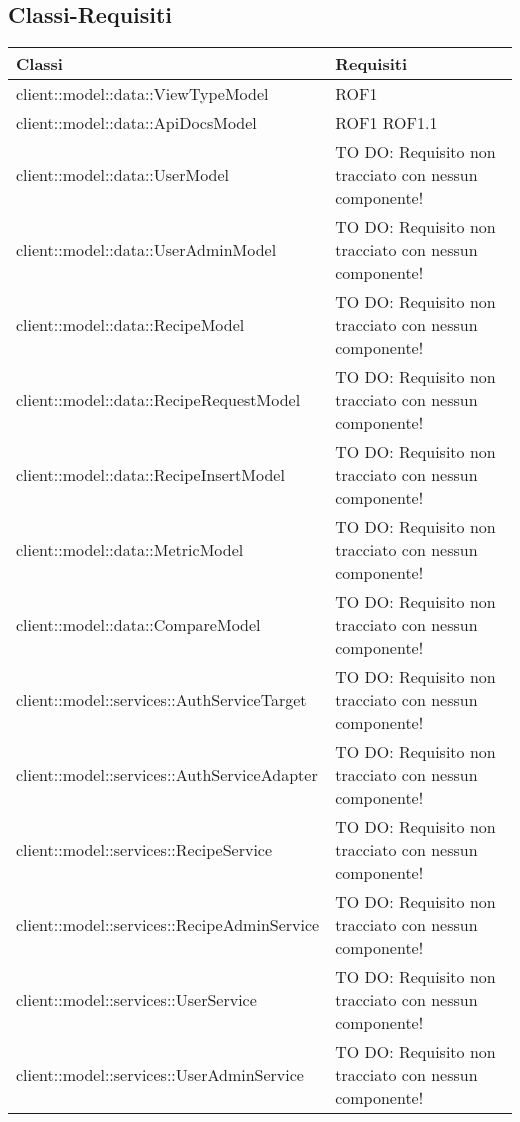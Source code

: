 \subsection{Classi-Requisiti} %
\label{sub:classi_requisiti}
\begin{center}
\def\arraystretch{1.5}
\bgroup
\begin{longtable}{| p{11cm} | p{2.5cm} |}
\hline
\textbf{Classi} & \textbf{Requisiti} \\
\hline
client::model::data::ViewTypeModel & ROF1 \\
\hline
client::model::data::ApiDocsModel & ROF1 \newline ROF1.1 \\
\hline
client::model::data::UserModel & TO DO: Requisito non tracciato con nessun componente! \\
\hline
client::model::data::UserAdminModel & TO DO: Requisito non tracciato con nessun componente! \\
\hline
client::model::data::RecipeModel & TO DO: Requisito non tracciato con nessun componente! \\
\hline
client::model::data::RecipeRequestModel & TO DO: Requisito non tracciato con nessun componente! \\
\hline
client::model::data::RecipeInsertModel & TO DO: Requisito non tracciato con nessun componente! \\
\hline
client::model::data::MetricModel & TO DO: Requisito non tracciato con nessun componente! \\
\hline
client::model::data::CompareModel & TO DO: Requisito non tracciato con nessun componente! \\
\hline
client::model::services::AuthServiceTarget & TO DO: Requisito non tracciato con nessun componente! \\
\hline
client::model::services::AuthServiceAdapter & TO DO: Requisito non tracciato con nessun componente! \\
\hline
client::model::services::RecipeService & TO DO: Requisito non tracciato con nessun componente! \\
\hline
client::model::services::RecipeAdminService & TO DO: Requisito non tracciato con nessun componente! \\
\hline
client::model::services::UserService & TO DO: Requisito non tracciato con nessun componente! \\
\hline
client::model::services::UserAdminService & TO DO: Requisito non tracciato con nessun componente! \\
\hline

\end{longtable}
\end{center}
